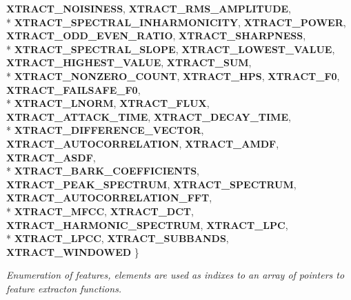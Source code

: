 \begin{DoxyCompactItemize}
{\bfseries X\-T\-R\-A\-C\-T\-\_\-\-N\-O\-I\-S\-I\-N\-E\-S\-S}, 
{\bfseries X\-T\-R\-A\-C\-T\-\_\-\-R\-M\-S\-\_\-\-A\-M\-P\-L\-I\-T\-U\-D\-E}, 
\\*
{\bfseries X\-T\-R\-A\-C\-T\-\_\-\-S\-P\-E\-C\-T\-R\-A\-L\-\_\-\-I\-N\-H\-A\-R\-M\-O\-N\-I\-C\-I\-T\-Y}, 
{\bfseries X\-T\-R\-A\-C\-T\-\_\-\-P\-O\-W\-E\-R}, 
{\bfseries X\-T\-R\-A\-C\-T\-\_\-\-O\-D\-D\-\_\-\-E\-V\-E\-N\-\_\-\-R\-A\-T\-I\-O}, 
{\bfseries X\-T\-R\-A\-C\-T\-\_\-\-S\-H\-A\-R\-P\-N\-E\-S\-S}, 
\\*
{\bfseries X\-T\-R\-A\-C\-T\-\_\-\-S\-P\-E\-C\-T\-R\-A\-L\-\_\-\-S\-L\-O\-P\-E}, 
{\bfseries X\-T\-R\-A\-C\-T\-\_\-\-L\-O\-W\-E\-S\-T\-\_\-\-V\-A\-L\-U\-E}, 
{\bfseries X\-T\-R\-A\-C\-T\-\_\-\-H\-I\-G\-H\-E\-S\-T\-\_\-\-V\-A\-L\-U\-E}, 
{\bfseries X\-T\-R\-A\-C\-T\-\_\-\-S\-U\-M}, 
\\*
{\bfseries X\-T\-R\-A\-C\-T\-\_\-\-N\-O\-N\-Z\-E\-R\-O\-\_\-\-C\-O\-U\-N\-T}, 
{\bfseries X\-T\-R\-A\-C\-T\-\_\-\-H\-P\-S}, 
{\bfseries X\-T\-R\-A\-C\-T\-\_\-\-F0}, 
{\bfseries X\-T\-R\-A\-C\-T\-\_\-\-F\-A\-I\-L\-S\-A\-F\-E\-\_\-\-F0}, 
\\*
{\bfseries X\-T\-R\-A\-C\-T\-\_\-\-L\-N\-O\-R\-M}, 
{\bfseries X\-T\-R\-A\-C\-T\-\_\-\-F\-L\-U\-X}, 
{\bfseries X\-T\-R\-A\-C\-T\-\_\-\-A\-T\-T\-A\-C\-K\-\_\-\-T\-I\-M\-E}, 
{\bfseries X\-T\-R\-A\-C\-T\-\_\-\-D\-E\-C\-A\-Y\-\_\-\-T\-I\-M\-E}, 
\\*
{\bfseries X\-T\-R\-A\-C\-T\-\_\-\-D\-I\-F\-F\-E\-R\-E\-N\-C\-E\-\_\-\-V\-E\-C\-T\-O\-R}, 
{\bfseries X\-T\-R\-A\-C\-T\-\_\-\-A\-U\-T\-O\-C\-O\-R\-R\-E\-L\-A\-T\-I\-O\-N}, 
{\bfseries X\-T\-R\-A\-C\-T\-\_\-\-A\-M\-D\-F}, 
{\bfseries X\-T\-R\-A\-C\-T\-\_\-\-A\-S\-D\-F}, 
\\*
{\bfseries X\-T\-R\-A\-C\-T\-\_\-\-B\-A\-R\-K\-\_\-\-C\-O\-E\-F\-F\-I\-C\-I\-E\-N\-T\-S}, 
{\bfseries X\-T\-R\-A\-C\-T\-\_\-\-P\-E\-A\-K\-\_\-\-S\-P\-E\-C\-T\-R\-U\-M}, 
{\bfseries X\-T\-R\-A\-C\-T\-\_\-\-S\-P\-E\-C\-T\-R\-U\-M}, 
{\bfseries X\-T\-R\-A\-C\-T\-\_\-\-A\-U\-T\-O\-C\-O\-R\-R\-E\-L\-A\-T\-I\-O\-N\-\_\-\-F\-F\-T}, 
\\*
{\bfseries X\-T\-R\-A\-C\-T\-\_\-\-M\-F\-C\-C}, 
{\bfseries X\-T\-R\-A\-C\-T\-\_\-\-D\-C\-T}, 
{\bfseries X\-T\-R\-A\-C\-T\-\_\-\-H\-A\-R\-M\-O\-N\-I\-C\-\_\-\-S\-P\-E\-C\-T\-R\-U\-M}, 
{\bfseries X\-T\-R\-A\-C\-T\-\_\-\-L\-P\-C}, 
\\*
{\bfseries X\-T\-R\-A\-C\-T\-\_\-\-L\-P\-C\-C}, 
{\bfseries X\-T\-R\-A\-C\-T\-\_\-\-S\-U\-B\-B\-A\-N\-D\-S}, 
{\bfseries X\-T\-R\-A\-C\-T\-\_\-\-W\-I\-N\-D\-O\-W\-E\-D}
 \}
\begin{DoxyCompactList}\small\item\em Enumeration of features, elements are used as indixes to an array of pointers to feature extracton functions. \end{DoxyCompactList}\item 

\end{DoxyCompactItemize}
